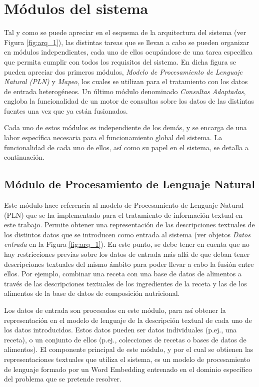 \section{Módulos del sistema}

Tal y como se puede apreciar en el esquema de la arquitectura del sistema (ver Figura \ref{fig:arq_1}), las distintas tareas que se llevan a cabo se pueden organizar en módulos independientes, cada uno de ellos ocupándose de una tarea específica que permita cumplir con todos los requisitos del sistema. En dicha figura se pueden apreciar dos primeros módulos, \textit{Modelo de Procesamiento de Lenguaje Natural (PLN)} y \textit{Mapeo}, los cuales se utilizan para el tratamiento con los datos de entrada heterogéneos. Un último módulo denominado \textit{Consultas Adaptadas}, engloba la funcionalidad de un motor de consultas sobre los datos de las distintas fuentes una vez que ya están fusionados.%

Cada uno de estos módulos es independiente de los demás, y se encarga de una labor específica necesaria para el funcionamiento global del sistema. La funcionalidad de cada uno de ellos, así como su papel en el sistema, se detalla a continuación.

\subsection{Módulo de Procesamiento de Lenguaje Natural}

Este módulo hace referencia al modelo de Procesamiento de Lenguaje Natural (PLN) que se ha implementado para el tratamiento de información textual en este trabajo. Permite obtener una representación de las descripciones textuales de los distintos datos que se introducen como entrada al sistema (ver objetos \textit{Datos entrada} en la Figura \ref{fig:arq_1}). En este punto, se debe tener en cuenta que no hay restricciones previas sobre los datos de entrada más allá de que deban tener descripciones textuales del mismo ámbito para poder llevar a cabo la fusión entre ellos. Por ejemplo, combinar una receta con una base de datos de alimentos a través de las descripciones textuales de los ingredientes de la receta y las de los alimentos de la base de datos de composición nutricional.

Los datos de entrada son procesados en este módulo, para así obtener la representación en el modelo de lenguaje de la descripción textual de cada uno de los datos introducidos. Estos datos pueden ser datos individuales (p.ej., una receta), o un conjunto de ellos (p.ej., colecciones de recetas o bases de datos de alimentos). El componente principal de este módulo, y por el cual se obtienen las representaciones textuales que utiliza el sistema, es un modelo de procesamiento de lenguaje formado por un Word Embedding entrenado en el dominio específico del problema que se pretende resolver. 

